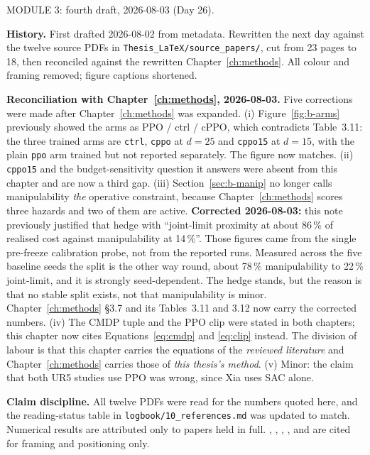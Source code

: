 \begin{draftnote}
MODULE 3: fourth draft, 2026-08-03 (Day 26).

\textbf{History.} First drafted 2026-08-02 from metadata. Rewritten the next day against the
twelve source PDFs in \texttt{Thesis\_LaTeX/source\_papers/}, cut from 23 pages to 18, then
reconciled against the rewritten Chapter~\ref{ch:methods}. All colour and framing removed;
figure captions shortened.

\textbf{Reconciliation with Chapter~\ref{ch:methods}, 2026-08-03.} Five corrections were made
after Chapter~\ref{ch:methods} was expanded. (i) Figure~\ref{fig:b-arms} previously showed the
arms as PPO / ctrl / cPPO, which contradicts Table~3.11: the three trained arms are
\texttt{ctrl}, \texttt{cppo} at \(d=25\) and \texttt{cppo15} at \(d=15\), with the plain
\texttt{ppo} arm trained but not reported separately. The figure now matches.
(ii) \texttt{cppo15} and the budget-sensitivity question it answers were absent from this
chapter and are now a third gap. (iii) Section~\ref{sec:b-manip} no longer calls manipulability
\emph{the} operative constraint, because Chapter~\ref{ch:methods} scores three hazards and two of
them are active. \textbf{Corrected 2026-08-03:} this note previously justified that hedge with
``joint-limit proximity at about 86\,\% of realised cost against manipulability at 14\,\%''. Those
figures came from the single pre-freeze calibration probe, not from the reported runs. Measured
across the five baseline seeds the split is the other way round, about 78\,\% manipulability to
22\,\% joint-limit, and it is strongly seed-dependent. The hedge stands, but the reason is that no
stable split exists, not that manipulability is minor. Chapter~\ref{ch:methods} \S3.7 and its
Tables~3.11 and 3.12 now carry the corrected numbers.
(iv) The CMDP tuple and the PPO clip were stated in both chapters; this chapter now cites
Equations~\eqref{eq:cmdp} and \eqref{eq:clip} instead. The division of labour is that this
chapter carries the equations of the \emph{reviewed literature} and Chapter~\ref{ch:methods}
carries those of \emph{this thesis's method}. (v) Minor: the claim that both UR5 studies use
PPO was wrong, since Xia uses SAC alone.

\textbf{Claim discipline.} All twelve PDFs were read for the numbers quoted here, and the
reading-status table in \texttt{logbook/10\_references.md} was updated to match. Numerical
results are attributed only to papers held in full. \cite{garcia2015survey},
\cite{brunke2022safe}, \cite{elguea2023review}, \cite{ji2023safetygymnasium},
\cite{altman1999cmdp} and \cite{khan2025csrt_ibvs} are cited for framing and positioning only.


\end{draftnote}
